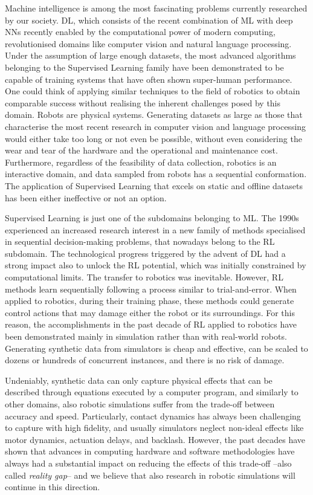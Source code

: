Machine intelligence is among the most fascinating problems currently researched by our society.
\ac{DL}, which consists of the recent combination of \ac{ML} with deep \acp{NN} recently enabled by the computational power of modern computing, revolutionised domains like computer vision and natural language processing.
Under the assumption of large enough datasets, the most advanced algorithms belonging to the Supervised Learning family have been demonstrated to be capable of training systems that have often shown super-human performance.
One could think of applying similar techniques to the field of robotics to obtain comparable success without realising the inherent challenges posed by this domain.
Robots are physical systems.
Generating datasets as large as those that characterise the most recent research in computer vision and language processing would either take too long or not even be possible, without even considering the wear and tear of the hardware and the operational and maintenance cost.
Furthermore, regardless of the feasibility of data collection, robotics is an interactive domain, and data sampled from robots has a sequential conformation.
The application of Supervised Learning that excels on static and offline datasets has been either ineffective or not an option.

Supervised Learning is just one of the subdomains belonging to \ac{ML}.
The 1990s experienced an increased research interest in a new family of methods specialised in sequential decision-making problems, that nowadays belong to the \ac{RL} subdomain. 
The technological progress triggered by the advent of \ac{DL} had a strong impact also to unlock the \ac{RL} potential, which was initially constrained by computational limits.
The transfer to robotics was inevitable.
However, \ac{RL} methods learn sequentially following a process similar to trial-and-error.
When applied to robotics, during their training phase, these methods could generate control actions that may damage either the robot or its surroundings. 
For this reason, the accomplishments in the past decade of \ac{RL} applied to robotics have been demonstrated mainly in simulation rather than with real-world robots.
Generating synthetic data from simulators is cheap and effective, can be scaled to dozens or hundreds of concurrent instances, and there is no risk of damage.

Undeniably, synthetic data can only capture physical effects that can be described through equations executed by a computer program, and similarly to other domains, also robotic simulations suffer from the trade-off between accuracy and speed.
Particularly, contact dynamics has always been challenging to capture with high fidelity, and usually simulators neglect non-ideal effects like motor dynamics, actuation delays, and backlash.
However, the past decades have shown that advances in computing hardware and software methodologies have always had a substantial impact on reducing the effects of this trade-off --also called \emph{reality gap}-- and we believe that also research in robotic simulations will continue in this direction.


